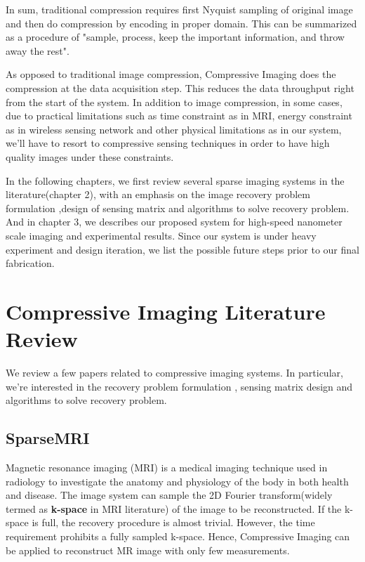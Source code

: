 \documentclass{article} %
\begin{document}
In sum, traditional compression requires first Nyquist sampling of original image and then do compression by encoding in proper domain. This can be summarized as a procedure of "sample, process, keep the important information, and throw away the rest". 

As opposed to traditional image compression, Compressive Imaging does the compression at the data acquisition step. This reduces the data throughput right from the start of the system. In addition to image compression, in some cases, due to practical limitations such as time constraint as in MRI\cite{lustig2007sparse}, energy constraint as in wireless sensing network and other physical limitations as in our system, we'll have to resort to compressive sensing techniques in order to have high quality images under these constraints. 

In the following chapters, we first review several sparse imaging systems in the literature(chapter 2), with an emphasis on the image recovery problem formulation ,design of sensing matrix and algorithms to solve recovery problem. And in chapter 3, we describes our proposed system for high-speed nanometer scale imaging and experimental results. Since our system is under heavy experiment and design iteration, we list the possible future steps prior to our final fabrication.

\section{Compressive Imaging Literature Review}
We review a few papers related to compressive imaging systems. In particular, we're interested in the recovery problem formulation , sensing matrix design and algorithms to solve recovery problem.
\subsection{SparseMRI}
Magnetic resonance imaging (MRI) is a medical imaging technique used in radiology to investigate the anatomy and physiology of the body in both health and disease\cite{wiki:MRI}. The image system can sample the 2D Fourier transform(widely termed as \textbf{k-space}\cite{twieg1983k} in MRI literature) of the image to be reconstructed. If the k-space is full, the recovery procedure is almost trivial. However, the time requirement prohibits a fully sampled k-space. Hence, Compressive Imaging can be applied to reconstruct MR image with only few measurements.
\end{document}

